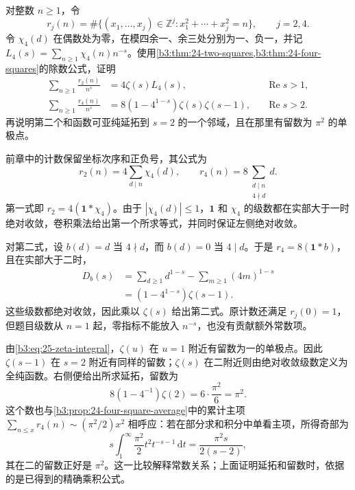 \begin{exercise}\label{b3:ex:25-8}
对整数 \(n\ge1\)，令
\[
 r_j(n)=\#\{(x_1,\ldots,x_j)\in\mathbb Z^j:
                   x_1^2+\cdots+x_j^2=n\},\qquad j=2,4.
\]
令 \(\chi_4(d)\) 在偶数处为零，在模四余一、余三处分别为一、负一，并记 \(L_4(s)=\sum_{n\ge1}\chi_4(n)n^{-s}\)。使用\cref{b3:thm:24-two-squares,b3:thm:24-four-squares}的除数公式，证明
\begin{align*}
 \sum_{n\ge1}\frac{r_2(n)}{n^s}
 &=4\zeta(s)L_4(s),&&\operatorname{Re}s>1,\\
 \sum_{n\ge1}\frac{r_4(n)}{n^s}
 &=8(1-4^{1-s})\zeta(s)\zeta(s-1),&&\operatorname{Re}s>2.
\end{align*}
再说明第二个和函数可亚纯延拓到 \(s=2\) 的一个邻域，且在那里有留数为 \(\pi^2\) 的单极点。
\end{exercise}
\begin{solution}
前章中的计数保留坐标次序和正负号，其公式为
\[
 r_2(n)=4\sum_{d\mid n}\chi_4(d),\qquad
 r_4(n)=8\sum_{\substack{d\mid n\\4\nmid d}}d.
\]
第一式即 \(r_2=4(\mathbf1*\chi_4)\)。由于 \(|\chi_4(d)|\le1\)，\(\mathbf1\) 和 \(\chi_4\) 的级数都在实部大于一时绝对收敛，卷积乘法给出第一个所求等式，并同时保证左侧绝对收敛。

对第二式，设 \(b(d)=d\) 当 \(4\nmid d\)，而 \(b(d)=0\) 当 \(4\mid d\)。于是 \(r_4=8(\mathbf1*b)\)，且在实部大于二时，
\[
 \begin{aligned}
 D_b(s)
 &=\sum_{d\ge1}d^{1-s}-\sum_{m\ge1}(4m)^{1-s}\\
 &=(1-4^{1-s})\zeta(s-1).
 \end{aligned}
\]
这些级数都绝对收敛，因此乘以 \(\zeta(s)\) 给出第二式。原计数还满足 \(r_j(0)=1\)，但题目级数从 \(n=1\) 起，零指标不能放入 \(n^{-s}\)，也没有贡献额外常数项。

由\eqref{b3:eq:25-zeta-integral}，\(\zeta(u)\) 在 \(u=1\) 附近有留数为一的单极点。因此 \(\zeta(s-1)\) 在 \(s=2\) 附近有同样的留数；\(\zeta(s)\) 在二附近则由绝对收敛级数定义为全纯函数。右侧便给出所求延拓，留数为
\[
 8(1-4^{-1})\zeta(2)=6\cdot\frac{\pi^2}{6}=\pi^2.
\]
这个数也与\cref{b3:prop:24-four-square-average}中的累计主项
\(\sum_{n\le x}r_4(n)\sim(\pi^2/2)x^2\) 相呼应：若在部分求和积分中单看主项，所得奇部为
\[
 s\int_1^\infty\frac{\pi^2}{2}t^2t^{-s-1}\,\mathrm dt
 =\frac{\pi^2s}{2(s-2)},
\]
其在二的留数正好是 \(\pi^2\)。这一比较解释常数关系；上面证明延拓和留数时，依据的是已得到的精确乘积公式。
\end{solution}
